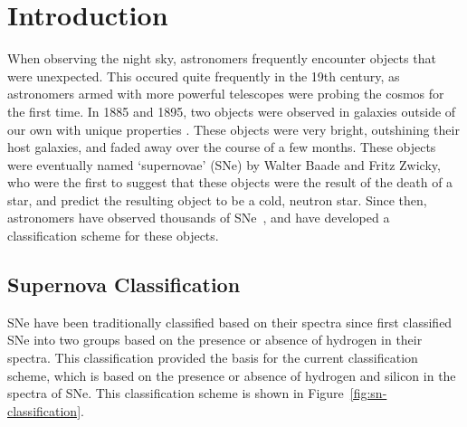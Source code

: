 \chapter{Introduction}
\label{chap:introduction}

% 

When observing the night sky, astronomers frequently encounter objects that 
were unexpected. This occured quite frequently in the 19th century, as astronomers 
armed with more powerful telescopes were probing the cosmos for the first time. 
In 1885 and 1895, two objects were observed in galaxies outside of our own with unique 
properties \parencite{deVaucouleurs1985, Schaefer1995}. These objects were very 
bright, outshining their host galaxies, and faded away over the course of a few months.
These objects were eventually named `supernovae' (SNe) by Walter Baade and Fritz Zwicky, who were the first to suggest that
these objects were the result of the death of a star, and predict the resulting 
object to be a cold, neutron star\parencite{Baade1934}. Since then, astronomers 
have observed thousands of SNe~\parencite{Barbon1999}, and have
developed a classification scheme for these objects.  

\section{Supernova Classification}
\label{sec:supernova-classification}
SNe have been traditionally classified based on their spectra since 
\textcite{Minkowski1941} first classified SNe into two groups based on the
presence or absence of hydrogen in their spectra. This classification provided 
the basis for the current classification scheme, which is based on the presence
or absence of hydrogen and silicon in the spectra of SNe. This classification 
scheme is shown in Figure~\ref{fig:sn-classification}. 

